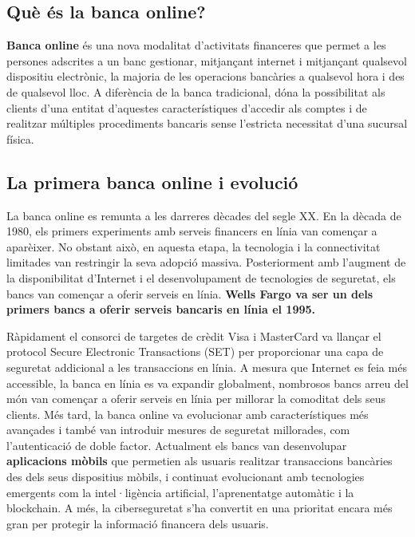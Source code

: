 
\subsection*{Què és la banca online?}


\textbf{Banca online} és una nova modalitat d'activitats financeres que permet a les persones adscrites a un banc gestionar, mitjançant internet i mitjançant qualsevol dispositiu electrònic, la majoria de les operacions bancàries a qualsevol hora i des de qualsevol lloc. A diferència de la banca tradicional, dóna la possibilitat als clients d'una entitat d'aquestes característiques d'accedir als comptes i de realitzar múltiples procediments bancaris sense l'estricta necessitat d'una sucursal física. 


\subsection*{La primera banca online i evolució}

La banca online es remunta a les darreres dècades del segle XX. En la dècada de 1980, els primers experiments amb serveis financers en línia van començar a aparèixer. No obstant això, en aquesta etapa, la tecnologia i la connectivitat limitades van restringir la seva adopció massiva. Posteriorment amb l'augment de la disponibilitat d'Internet i el desenvolupament de tecnologies de seguretat, els bancs van començar a oferir serveis en línia. \textbf{Wells Fargo va ser un dels primers bancs a oferir serveis bancaris en línia el 1995.}

Ràpidament el consorci de targetes de crèdit Visa i MasterCard va llançar el protocol Secure Electronic Transactions (SET) per proporcionar una capa de seguretat addicional a les transaccions en línia. A mesura que Internet es feia més accessible, la banca en línia es va expandir globalment, nombrosos bancs arreu del món van començar a oferir serveis en línia per millorar la comoditat dels seus clients. Més tard, la banca online va evolucionar amb característiques més avançades i  també van introduir mesures de seguretat millorades, com l'autenticació de doble factor. Actualment els bancs van desenvolupar \textbf{aplicacions mòbils} que permetien als usuaris realitzar transaccions bancàries des dels seus dispositius mòbils, i  continuat evolucionant amb tecnologies emergents com la intel·ligència artificial, l'aprenentatge automàtic i la blockchain. A més, la ciberseguretat s'ha convertit en una prioritat encara més gran per protegir la informació financera dels usuaris.


